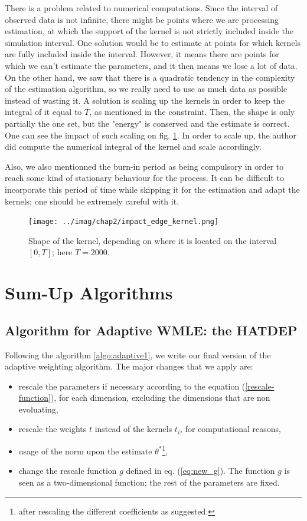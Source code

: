 \documentclass[11pt]{book}
\begin{document}
There is a problem related to numerical computations. Since the interval of observed data is not infinite, there might be points where we are processing estimation, at which the support of the kernel is not strictly included inside the simulation interval. One solution would be to estimate at points for which kernels are fully included inside the interval. However, it means there are points for which we can't estimate the parameters, and it then means we lose a lot of data. On the other hand, we saw that there is a quadratic tendency in the complexity of the estimation algorithm, so we really need to use as much data as possible instead of wasting it. A solution is scaling up the kernels in order to keep the integral of it equal to $T$, as mentioned in the constraint. Then, the shape is only partially the one set, but the "energy" is conserved and the estimate is correct. One can see the impact of such scaling on fig. \ref{fig:scaling_kernels}. In order to scale up, the author did compute the numerical integral of the kernel and scale accordingly.

Also, we also mentionned the burn-in period as being compulsory in order to reach some kind of stationary behaviour for the process. It can be difficult to incorporate this period of time while skipping it for the estimation and adapt the kernels; one should be extremely careful with it.



\begin{figure}
\centering
\texttt{[image: ../imag/chap2/impact\_edge\_kernel.png]}
\caption{Shape of the kernel, depending on where it is located on the interval $[0,T]$; here $T = 2000$.}
\label{fig:scaling_kernels}
\end{figure}



\section{Sum-Up Algorithms}
\subsection{Algorithm for Adaptive WMLE: the HATDEP}
Following the algorithm \ref{algo:adaptive1}, we write our final version of the adaptive weighting algorithm. The major changes that we apply are:

\begin{itemize}
\item rescale the parameters if necessary according to the equation (\ref{rescale-function}), for each dimension, excluding the dimensions that are non evoluating,
\item rescale the weights $t$ instead of the kernels $t_i$, for computational reasons,
\item usage of the norm upon the estimate $\theta^*$\footnote{after rescaling the different coefficients as suggested.},
\item change the rescale function $g$ defined in eq. (\ref{eq:new_g}). The function $g$ is seen as a two-dimensional function; the rest of the parameters are fixed.
\end{itemize}
\end{document}

